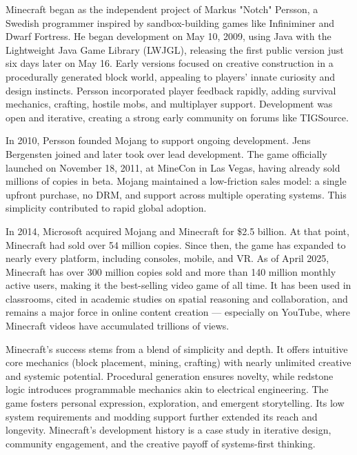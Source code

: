 \begin{historical}
Minecraft began as the independent project of Markus "Notch" Persson, a Swedish programmer inspired by sandbox-building games like Infiniminer and Dwarf Fortress. He began development on May 10, 2009, using Java with the Lightweight Java Game Library (LWJGL), releasing the first public version just six days later on May 16. Early versions focused on creative construction in a procedurally generated block world, appealing to players' innate curiosity and design instincts. Persson incorporated player feedback rapidly, adding survival mechanics, crafting, hostile mobs, and multiplayer support. Development was open and iterative, creating a strong early community on forums like TIGSource.

In 2010, Persson founded Mojang to support ongoing development. Jens Bergensten joined and later took over lead development. The game officially launched on November 18, 2011, at MineCon in Las Vegas, having already sold millions of copies in beta. Mojang maintained a low-friction sales model: a single upfront purchase, no DRM, and support across multiple operating systems. This simplicity contributed to rapid global adoption.

In 2014, Microsoft acquired Mojang and Minecraft for \$2.5 billion. At that point, Minecraft had sold over 54 million copies. Since then, the game has expanded to nearly every platform, including consoles, mobile, and VR. As of April 2025, Minecraft has over 300 million copies sold and more than 140 million monthly active users, making it the best-selling video game of all time. It has been used in classrooms, cited in academic studies on spatial reasoning and collaboration, and remains a major force in online content creation — especially on YouTube, where Minecraft videos have accumulated trillions of views.

Minecraft’s success stems from a blend of simplicity and depth. It offers intuitive core mechanics (block placement, mining, crafting) with nearly unlimited creative and systemic potential. Procedural generation ensures novelty, while redstone logic introduces programmable mechanics akin to electrical engineering. The game fosters personal expression, exploration, and emergent storytelling. Its low system requirements and modding support further extended its reach and longevity. Minecraft’s development history is a case study in iterative design, community engagement, and the creative payoff of systems-first thinking.
\end{historical}